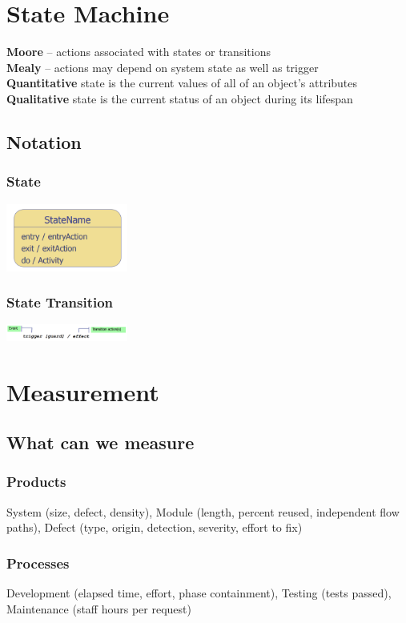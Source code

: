 \documentclass[10pt,a4paper]{article}
\begin{document}
\begin{landscape}
\begin{multicols}{3}
\section{State Machine}
\textbf{Moore} -- actions associated with states or transitions\\
\textbf{Mealy} -- actions may depend on system state as well as trigger\\
\textbf{Quantitative} state is the current values of all of an object's attributes\\
\textbf{Qualitative} state is the current status of an object during its lifespan\\
\subsection{Notation}
\subsubsection{State}
\includegraphics[width=0.3\textwidth]{State}
\subsubsection{State Transition}
\includegraphics[width=0.3\textwidth]{Transition}

\section{Measurement}
\subsection{What can we measure}
\subsubsection{Products}
System (size, defect, density), Module (length, percent reused, independent flow paths), Defect (type, origin, detection, severity, effort to fix)
\subsubsection{Processes}
Development (elapsed time, effort, phase containment), Testing (tests passed), Maintenance (staff hours per request)

\end{multicols}
\end{landscape}
\end{document}

